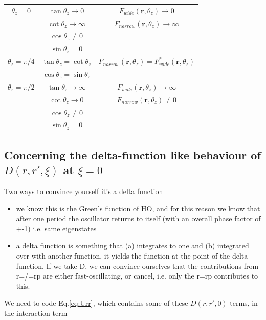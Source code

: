 \documentclass[a4paper,nobalancelastpage]{revtex4-1}
\begin{document}
\begin{center}
 \begin{tabular}{|c | c | c|} 
 \hline
$\theta_z=0$ 
& $\tan{\theta_z} \rightarrow 0$ 
& $F_{wide}(\textbf{r},\theta_z)\rightarrow 0$ 
\\ 
& $\cot{\theta_z} \rightarrow \infty$  
& $F_{narrow}(\textbf{r},\theta_z)\rightarrow \infty$ 
\\
& $\cos{\theta_z} \neq 0$  
& 
\\
& $\sin{\theta_z} = 0 $ 
& 
\\
\hline
$\theta_z=\pi / 4$ 
& $\tan{\theta_z} = \cot{\theta_z}$ 
& $F_{narrow}(\textbf{r},\theta_z)=F_{wide}^*(\textbf{r},\theta_z) $ 
\\
& $\cos{\theta_z} = \sin{\theta_z}$  
& 
\\
\hline
$\theta_z=\pi / 2 $
& $\tan{\theta_z} \rightarrow \infty $
& $F_{wide}(\textbf{r},\theta_z)\rightarrow \infty $
\\ 
& $\cot{\theta_z} \rightarrow 0  $
& $F_{narrow}(\textbf{r},\theta_z)\neq 0 $
\\
 & $\cos{\theta_z} \neq 0  $
 & 
 \\
 & $\sin{\theta_z} = 0  $
 & 
 \\
\hline
\end{tabular}

\end{center}

\subsection{Concerning the delta-function like behaviour of $D(r,r',\xi)$ at $\xi=0$}

Two ways to convince yourself it's a delta function

\begin{itemize}
\item we know this is the Green's function of HO, and for this reason we know that after one period the oscillator returns to itself (with an overall phase factor of +-1) i.e. same eigenstates 
\item a delta function is something that (a) integrates to one and (b) integrated over with another function, it yields the function at the point of the delta function. If we take D, we can convince ourselves that the contributions from r=/=rp are either fast-oscillating, or cancel, i.e. only the r=rp contributes to this.
\end{itemize}

We need to code Eq.\ref{eq:Urr}, which contains some of these $D(r,r',0)$ terms, in the interaction term 
\end{document}

